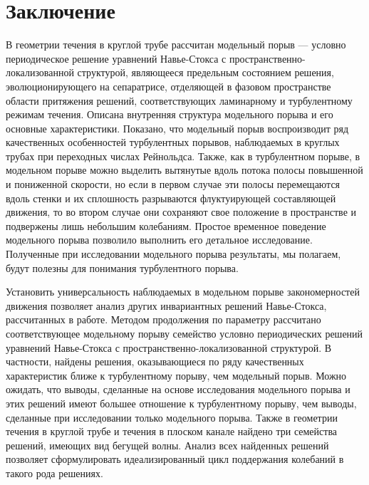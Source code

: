 \chapter*{Заключение} 


В геометрии течения в круглой трубе рассчитан модельный порыв --- условно периодическое решение уравнений Навье-Стокса с пространственно-локализованной структурой, являющееся предельным состоянием решения, эволюционирующего на сепаратрисе, отделяющей в фазовом пространстве области притяжения решений, соответствующих ламинарному и турбулентному режимам течения. Описана внутренняя структура модельного порыва и его основные характеристики. Показано, что модельный порыв воспроизводит ряд качественных особенностей турбулентных порывов, наблюдаемых в круглых трубах при переходных числах Рейнольдса. Также, как в турбулентном порыве, в модельном порыве можно выделить вытянутые вдоль потока полосы повышенной и пониженной скорости, но если в первом случае эти полосы перемещаются вдоль стенки и их сплошность разрываются флуктуирующей составляющей движения, то во втором случае они сохраняют свое положение в пространстве и подвержены лишь небольшим колебаниям. Простое временное поведение модельного порыва позволило выполнить его детальное исследование. Полученные при исследовании модельного порыва результаты, мы полагаем, будут полезны для понимания турбулентного порыва. 

Установить универсальность наблюдаемых в модельном порыве закономерностей движения позволяет анализ других инвариантных решений Навье-Стокса, рассчитанных в работе. Методом продолжения по параметру рассчитано соответствующее модельному порыву семейство условно периодических решений уравнений Навье-Стокса с пространственно-локализованной структурой. В частности, найдены решения, оказывающиеся по ряду качественных характеристик ближе к турбулентному порыву, чем модельный порыв. Можно ожидать, что выводы, сделанные на основе исследования модельного порыва и этих решений имеют большее отношение к турбулентному порыву, чем выводы, сделанные при исследовании только модельного порыва. Также в геометрии течения в круглой трубе и течения в плоском канале найдено три семейства решений, имеющих вид бегущей волны. Анализ всех найденных решений позволяет сформулировать идеализированный цикл поддержания колебаний в такого рода решениях. 

